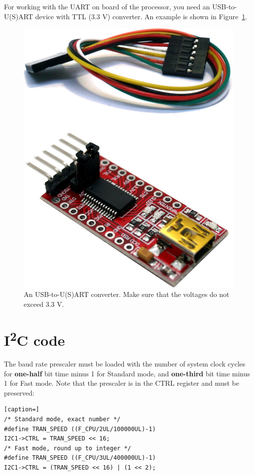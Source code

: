 \documentclass[12pt]{article}
\begin{document}
For working with the UART on board of the processor, you need an USB-to-U(S)ART device with TTL (3.3 V) converter. An example is shown in Figure~\ref{fig:usb-usart-ttl}.

\begin{figure}[!ht]
\centering
\includegraphics[scale=0.1]{images/usb-usart-ttl}
\caption{An USB-to-U(S)ART converter. Make sure that the voltages do not exceed 3.3 V.}
\label{fig:usb-usart-ttl}
\end{figure}


\section{I\textsuperscript{2}C code}
The baud rate prescaler must be loaded with the number of system clock cycles for \textbf{one-half} bit time minus 1 for Standard mode, and \textbf{one-third} bit time minus 1 for Fast mode. Note that the prescaler is in the CTRL register and must be preserved:

\begin{lstlisting}[caption=]
/* Standard mode, exact number */
#define TRAN_SPEED ((F_CPU/2UL/100000UL)-1)
I2C1->CTRL = TRAN_SPEED << 16;
/* Fast mode, round up to integer */
#define TRAN_SPEED ((F_CPU/3UL/400000UL)-1)
I2C1->CTRL = (TRAN_SPEED << 16) | (1 << 2);
\end{lstlisting} 
\end{document}
